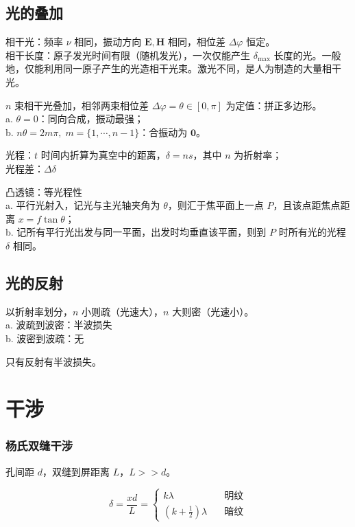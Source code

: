 \documentclass[12pt, a4paper, UTF8, openany]{ctexbook}
\newcommand{\vect}[1]{\mathbf{#1}}
\begin{document}
        \subsection{光的叠加}
        相干光：频率 $\nu$ 相同，振动方向 $\vect{E}, \vect{H}$ 相同，相位差 $\Delta\varphi$ 恒定。\\
        相干长度：原子发光时间有限（随机发光），一次仅能产生 $\delta_{\max}$ 长度的光。一般地，仅能利用同一原子产生的光造相干光束。激光不同，是人为制造的大量相干光。

        $n$ 束相干光叠加，相邻两束相位差 $\Delta\varphi = \theta \in [0, \pi]$ 为定值：拼正多边形。\\
        a. $\theta = 0$：同向合成，振动最强；\\
        b. $n\theta = 2 m \pi, \; m = \{1, \cdots, n - 1\}$：合振动为 $\vect{0}$。

        光程：$t$ 时间内折算为真空中的距离，$\delta = n s$，其中 $n$ 为折射率；\\
        光程差：$\Delta\delta$

        凸透镜：等光程性 \\
        a. 平行光射入，记光与主光轴夹角为 $\theta$，则汇于焦平面上一点 $P$，且该点距焦点距离 $x = f\tan\theta$；\\
        b. 记所有平行光出发与同一平面，出发时均垂直该平面，则到 $P$ 时所有光的光程 $\delta$ 相同。
        
        \subsection{光的反射}
        以折射率划分，$n$ 小则疏（光速大），$n$ 大则密（光速小）。\\
        a. 波疏到波密：半波损失 \\
        b. 波密到波疏：无

        {\heiti 只有反射有半波损失}。

    \section{干涉}
        \subsubsection{杨氏双缝干涉}
        孔间距 $d$，双缝到屏距离 $L$，$L >> d$。

        $$\delta = \dfrac{x d}{L} = \begin{cases}
            k \lambda & \quad \text{明纹} \\
            (k + \frac{1}{2}) \lambda & \quad \text{暗纹}
        \end{cases}$$
\end{document}
